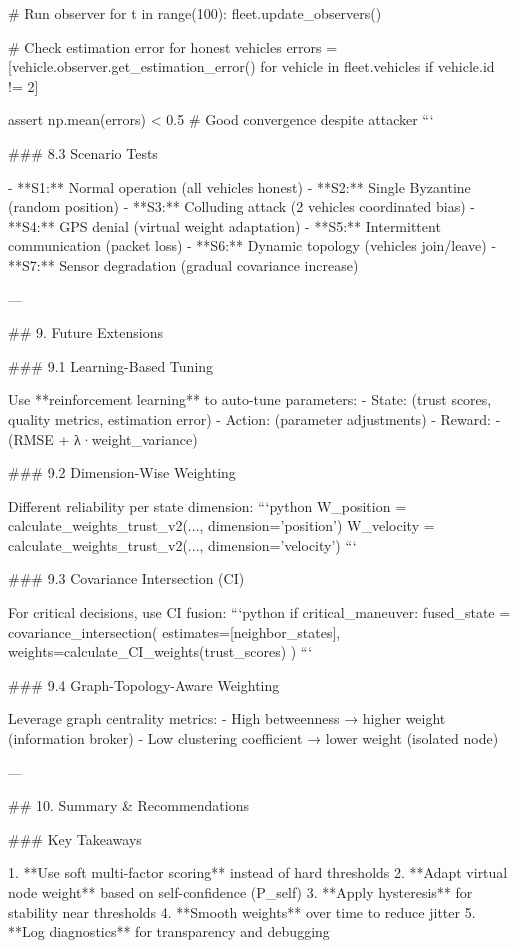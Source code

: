     # Run observer
    for t in range(100):
        fleet.update_observers()
    
    # Check estimation error for honest vehicles
    errors = [vehicle.observer.get_estimation_error() 
              for vehicle in fleet.vehicles if vehicle.id != 2]
    
    assert np.mean(errors) < 0.5  # Good convergence despite attacker
```

### 8.3 Scenario Tests

- **S1:** Normal operation (all vehicles honest)
- **S2:** Single Byzantine (random position)
- **S3:** Colluding attack (2 vehicles coordinated bias)
- **S4:** GPS denial (virtual weight adaptation)
- **S5:** Intermittent communication (packet loss)
- **S6:** Dynamic topology (vehicles join/leave)
- **S7:** Sensor degradation (gradual covariance increase)

---

## 9. Future Extensions

### 9.1 Learning-Based Tuning

Use **reinforcement learning** to auto-tune parameters:
- State: (trust scores, quality metrics, estimation error)
- Action: (parameter adjustments)
- Reward: -(RMSE + λ·weight_variance)

### 9.2 Dimension-Wise Weighting

Different reliability per state dimension:
```python
W_position = calculate_weights_trust_v2(..., dimension='position')
W_velocity = calculate_weights_trust_v2(..., dimension='velocity')
```

### 9.3 Covariance Intersection (CI)

For critical decisions, use CI fusion:
```python
if critical_maneuver:
    fused_state = covariance_intersection(
        estimates=[neighbor_states],
        weights=calculate_CI_weights(trust_scores)
    )
```

### 9.4 Graph-Topology-Aware Weighting

Leverage graph centrality metrics:
- High betweenness → higher weight (information broker)
- Low clustering coefficient → lower weight (isolated node)

---

## 10. Summary & Recommendations

### Key Takeaways

1. **Use soft multi-factor scoring** instead of hard thresholds
2. **Adapt virtual node weight** based on self-confidence (P_self)
3. **Apply hysteresis** for stability near thresholds
4. **Smooth weights** over time to reduce jitter
5. **Log diagnostics** for transparency and debugging

